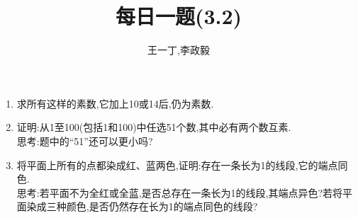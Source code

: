 \documentclass[UTF8]{ctexart}
\title{每日一题(3.2)}
\author{王一丁,李政毅}
\begin{document}
\maketitle
\begin{enumerate}
\item 求所有这样的素数,它加上10或14后,仍为素数.\\
\item 证明:从1至100(包括1和100)中任选51个数,其中必有两个数互素.\\
思考:题中的“51”还可以更小吗?
\item 将平面上所有的点都染成红、蓝两色,证明:存在一条长为1的线段,它的端点同色.\\
思考:若平面不为全红或全蓝,是否总存在一条长为1的线段,其端点异色?若将平面染成三种颜色,是否仍然存在长为1的端点同色的线段?
\end{enumerate}
\end{document}

